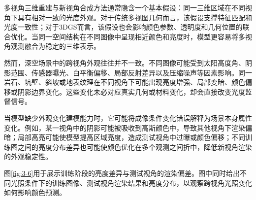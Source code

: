 多视角三维重建与新视角合成方法通常隐含一个基本假设：同一三维区域在不同视角下具有相对一致的光度外观。对于传统多视图几何而言，该假设支撑特征匹配和光度一致性；对于3DGS而言，该假设也会影响颜色参数、透明度和几何位置的联合优化。当同一空间结构在不同图像中呈现相近颜色和亮度时，模型更容易将多视角观测融合为稳定的三维表示。

然而，深空场景中的跨视角外观往往并不一致。不同图像可能受到太阳高度角、阴影范围、传感器曝光、白平衡偏移、局部反射差异以及压缩噪声等因素影响。同一岩石、坑壁、斜坡或地表纹理在不同视角下可能出现亮度增强、局部变暗、颜色偏移或阴影边界变化。这些变化未必对应真实几何或材料变化，却会直接改变光度监督信号。

当模型缺少外观变化建模能力时，它可能将成像条件变化错误解释为场景本身属性变化。例如，某一视角中的阴影可能被吸收到高斯颜色中，导致其他视角下渲染偏暗；局部高亮可能使模型提高区域亮度，造成测试视角中过曝或颜色偏移；不同训练图之间的亮度分布差异也可能使颜色优化在多个观测之间折中，降低新视角渲染的外观稳定性。

图\ref{fig:3-6}用于展示训练阶段的亮度差异与测试视角的渲染偏差。图中同时给出不同光照条件下的训练图像、测试视角渲染结果和亮度分布，以观察跨视角光照变化如何影响颜色预测。

